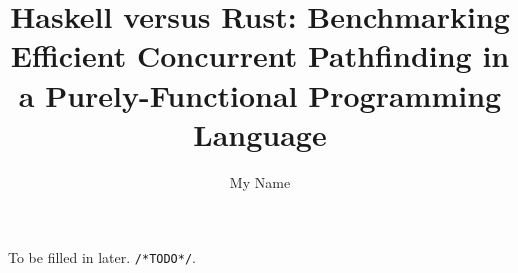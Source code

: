 \documentclass[oneside]{etd}
\title{Haskell versus Rust: Benchmarking Efficient Concurrent Pathfinding in a Purely-Functional Programming Language}
\author{My Name}
\begin{document}
\maketitle
\makerecomm
\makeacceptance
\makedeclaration


\begin{execsummary}
	To be filled in later. \verb|/*TODO*/|.
\end{execsummary}

	



\begingroup
\renewcommand*{\addvspace}[1]{}
\tableofcontents
\listoffigures
\listoftables
\endgroup

\beginbody
{}


%
%
%
%
%

\appendix
% 
% 
% 

% 

\nocite{*}

{
\singlespace

}


\end{document}
